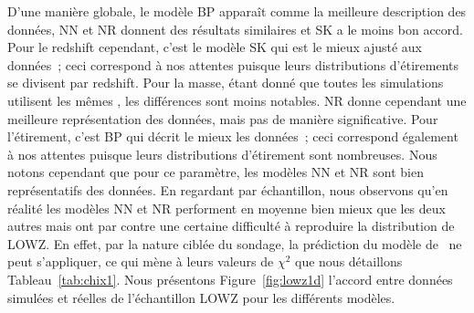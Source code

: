 \documentclass[../main/main.tex]{subfiles}
\begin{document}
D'une manière globale, le modèle BP apparaît comme la meilleure description des
données, NN et NR donnent des résultats similaires et SK a le moins bon accord.
Pour le redshift cependant, c'est le modèle SK qui est le mieux ajusté aux
données~; ceci correspond à nos attentes puisque leurs distributions
d'étirements se divisent par redshift. Pour la masse, étant donné que toutes les
simulations utilisent les mêmes \wgtmap, les différences sont moins notables. NR
donne cependant une meilleure représentation des données, mais pas de manière
significative. Pour l'étirement, c'est BP qui décrit le mieux les données~; ceci
correspond également à nos attentes puisque leurs distributions d'étirement sont
nombreuses. Nous notons cependant que pour ce paramètre, les modèles NN et NR
sont bien représentatifs des données. En regardant par échantillon, nous
observons qu'en réalité les modèles NN et NR performent en moyenne bien mieux
que les deux autres mais ont par contre une certaine difficulté à reproduire la
distribution de LOWZ. En effet, par la nature ciblée du sondage, la prédiction
du modèle de~ ne peut s'appliquer, ce qui mène à leurs
valeurs de $\chi^2$ que nous détaillons Tableau~\ref{tab:chix1}. Nous présentons
Figure~\ref{fig:lowz1d} l'accord entre données simulées et réelles de
l'échantillon LOWZ pour les différents modèles.
\end{document}
